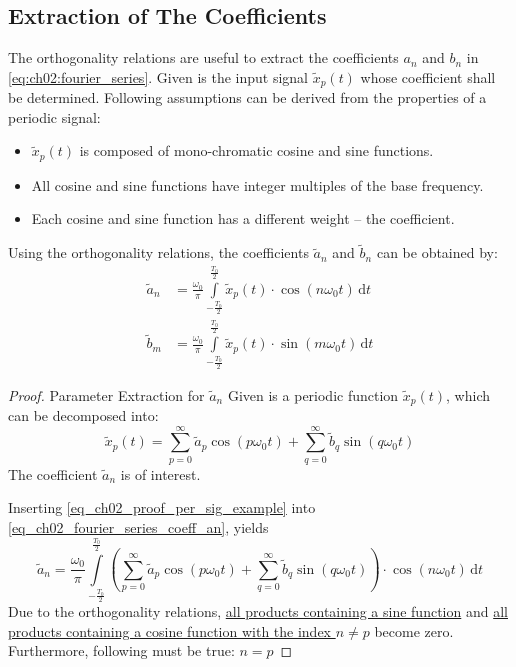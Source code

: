 \begin{refsection}
\subsection{Extraction of The Coefficients}

The orthogonality relations are useful to extract the coefficients $a_n$ and $b_n$ in \eqref{eq:ch02:fourier_series}. Given is the input signal $\tilde{x}_p(t)$ whose coefficient shall be determined. Following assumptions can be derived from the properties of a periodic signal:
\begin{itemize}
	\item $\tilde{x}_p(t)$ is composed of mono-chromatic cosine and sine functions.
	\item All cosine and sine functions have integer multiples of the base frequency.
	\item Each cosine and sine function has a different weight -- the coefficient.
\end{itemize}

Using the orthogonality relations, the coefficients $\tilde{a}_n$ and $\tilde{b}_n$ can be obtained by:
\begin{subequations}
	\begin{align}
		\tilde{a}_n &= \frac{\omega_0}{\pi} \int\limits_{-\frac{T_0}{2}}^{\frac{T_0}{2}} \tilde{x}_p(t) \cdot \cos\left(n \omega_0 t\right) \, \mathrm{d} t \label{eq_ch02_fourier_series_coeff_an} \\
		\tilde{b}_m &= \frac{\omega_0}{\pi} \int\limits_{-\frac{T_0}{2}}^{\frac{T_0}{2}} \tilde{x}_p(t) \cdot \sin\left(m \omega_0 t\right) \, \mathrm{d} t \label{eq_ch02_fourier_series_coeff_bm}
	\end{align}
\end{subequations}

\begin{proof}{Parameter Extraction for $\tilde{a}_n$}
	Given is a periodic function $\tilde{x}_p(t)$, which can be decomposed into:
	\begin{equation}
		\tilde{x}_p(t) = \sum\limits_{p=0}^{\infty} \tilde{a}_p \cos\left(p \omega_0 t\right) + \sum\limits_{q=0}^{\infty} \tilde{b}_q \sin\left(q \omega_0 t\right)
		\label{eq_ch02_proof_per_sig_example}
	\end{equation}
	The coefficient $\tilde{a}_n$ is of interest.
	
	Inserting \eqref{eq_ch02_proof_per_sig_example} into \eqref{eq_ch02_fourier_series_coeff_an}, yields
	\begin{equation}
		\tilde{a}_n = \frac{\omega_0}{\pi} \int\limits_{-\frac{T_0}{2}}^{\frac{T_0}{2}} \left(\sum\limits_{p=0}^{\infty} \tilde{a}_p \cos\left(p \omega_0 t\right) + \sum\limits_{q=0}^{\infty} \tilde{b}_q \sin\left(q \omega_0 t\right)\right) \cdot \cos\left(n \omega_0 t\right) \, \mathrm{d} t
	\end{equation}
	Due to the orthogonality relations, \underline{all products containing a sine function} and \underline{all products containing a cosine function with the index $n \neq p$} become zero. Furthermore, following must be true: $n = p$
	

\end{proof}
\end{refsection}
